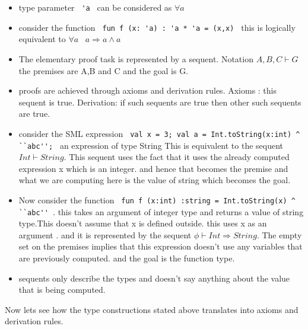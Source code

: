 \documentclass{article}
\begin{document}
\begin{itemize}
\item type parameter \verb| 'a | can be considered as $ \forall a $
\item consider the function \verb| fun f (x: 'a) : 'a * 'a = (x,x) |
  this is logically equivalent to $ \forall a \; \; \; a \Longrightarrow a \wedge a $

\item The elementary proof task is represented by a sequent. Notation $ A,B,C \vdash G $ the premises are A,B and C and the
  goal is G.
\item proofs are achieved through axioms and derivation rules. Axioms : this sequent  is true. Derivation: if such sequents are
  true then other such sequents are true.
\item consider the SML expression \verb| val x = 3; val a = Int.toString(x:int) ^ ``abc''; | an expression of type String
  This is equivalent to the sequent $ Int \vdash String $. This sequent uses the fact that it uses the already computed expression
  x which is an integer. and hence that becomes the premise and what we are computing here is the value of string which
  becomes the goal.
\item Now consider the function \verb| fun f (x:int) :string = Int.toString(x) ^ ``abc'' |. this takes an argument of integer
  type and returns a value of string type.This doesn't assume that x is defined outside. this uses x as an argument . and
  it is represented by the sequent $ \phi \vdash Int \Rightarrow String $. The empty set on the premises implies that this
  expression doesn't use any variables that are previously computed. and the goal is the function type.
\item sequents only describe the types and doesn't say anything about the value that is being computed.
\end{itemize}

Now lets see how the type constructions stated above translates into axioms and derivation rules.
\end{document}
